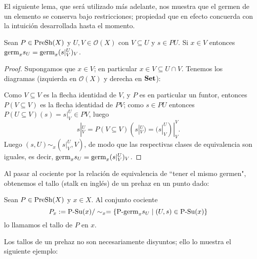 El siguiente lema, que será utilizado más adelante, nos muestra que el germen de un elemento se conserva bajo restricciones; propiedad que en efecto concuerda con la intuición desarrollada hasta el momento.
\begin{Lema}\label{Lema:LemaAzul}
   Sean $P\in\normalfont{\text{PreSh}}(X)$ y $U,V\in\mathcal{O}(X)$ con $V\subseteq U$ y $s\in PU$. Si $x\in V$ entonces $\normalfont{\text{germ}}_{x}s_{U}=\normalfont{\text{germ}}_{x}(s|^{U}_{V})_{V}$.
\end{Lema}
\begin{proof}
   Supongamos que $x\in V$; en particular $x\in V\subseteq U\cap V$. Tenemos los diagramas (izquierda en $\mathcal{O}(X)$ y derecha en $\normalfont{\textbf{Set}}$):
   
   Como $V\subseteq V$ es la flecha identidad de $V$, y $P$ es en particular un funtor, entonces $P(V\subseteq V)$ es la flecha identidad de $PV$; como $s\in PU$ entonces $P(U\subseteq V)(s)=s|^{U}_{V}\in PV$, luego 
   $$
   s|^{U}_{V}=P(V\subseteq V)(s|^{U}_{V})=(s|^{U}_{V})|^{V}_{V}.
   $$
   Luego $(s,U)\sim_{x}(s|^{U}_{V},V)$, de modo que las respectivas clases de equivalencia son iguales, es decir, $\normalfont{\text{germ}}_{x}s_{U}=\normalfont{\text{germ}}_{x}(s|^{U}_{V})_{V}$.
\end{proof}
Al pasar al cociente por la relación de equivalencia de ``tener el mismo germen", obtenemos el tallo (stalk en inglés) de un prehaz en un punto dado:
\begin{Def}
   Sean $P\in\normalfont{\text{PreSh}}(X)$ y $x\in X$. Al conjunto cociente
   $$
   P_{x}:=\normalfont{\text{P-Su}}(x)/\sim_{x}=\left\lbrace \normalfont{\text{P-germ}}_{x}s_{U}\mid (U,s)\in\normalfont{\text{P-Su}}(x)\right\rbrace
   $$
   lo llamamos el tallo de $P$ en $x$.
\end{Def}
Los tallos de un prehaz no son necesariamente disyuntos; ello lo muestra el siguiente ejemplo:
